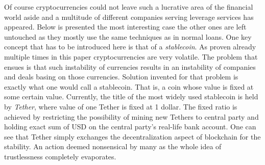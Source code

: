 \documentclass[a4paper,12pt,twoside,openany]{report}
\begin{document}
Of course cryptocurrencies could not leave such a lucrative area of the financial world aside and a multitude of different companies serving leverage services has appeared. Below is presented the most interesting case the other ones are left untouched as they mostly use the same techniques as in normal loans. One key concept that has to be introduced here is that of a \textit{stablecoin}. As proven already multiple times in this paper cryptocurrencies are very volatile. The problem that ensues is that such instability of currencies results in an instability of companies and deals basing on those currencies. Solution invented for that problem is exactly what one would call a stablecoin. That is, a coin whose value is fixed at some certain value. Currently, the title of the most widely used stablecoin is held by \textit{Tether}, where value of one Tether is fixed at 1 dollar. The fixed ratio is achieved by restricting the possibility of mining new Tethers to central party and holding exact sum of USD on the central party's real-life bank account. One can see that Tether simply exchanges the decentralization aspect of blockchain for the stability. An action deemed nonsensical by many as the whole idea of trustlessness completely evaporates.
\end{document}
